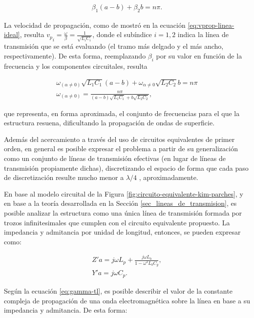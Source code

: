 \begin{align}
	\beta_1 (a-b) + \beta_2 b = n\pi .
\end{align}

La velocidad de propagación, como de mostró en la ecuación \ref{eq:vprop-linea-ideal}, resulta ${v_p}_i = \frac{\omega}{\beta} = \frac{1}{\sqrt{L_i C_i}}$, donde el subíndice $i=1,2$ indica la línea de transmisión que se está evaluando (el tramo más delgado y el más ancho, respectivamente). De esta forma, reemplazando $\beta_i$ por su valor en función de la frecuencia y los componentes circuitales, resulta

\begin{align}
	\omega_{(\alpha\neq 0)} \sqrt{L_1 C_1} (a-b) + \omega_{\alpha\neq 0} \sqrt{L_2 C_2} b = n\pi \\
	\omega_{(\alpha\neq 0)} = \frac{n\pi}{(a-b) \sqrt{L_1 C_1} + b \sqrt{L_2 C_2}},
\end{align}

que representa, en forma aproximada, el conjunto de frecuencias para el que la estructura resuena, dificultando la propagación de ondas de superficie.


Además del acercamiento a través del uso de circuitos equivalentes de primer orden, en general es posible expresar el problema a partir de su generalización como un conjunto de líneas de transmisión efectivas (en lugar de líneas de transmisión propiamente dichas), discretizando el espacio de forma que cada paso de discretización resulte mucho menor a $\lambda/4$ \cite{Caloz:ElectromagneticMetamaterials}, aproximadamente.

En base al modelo circuital de la Figura \ref{fig:circuito-equivalente-kim-parches}, y en base a la teoría desarrollada en la Sección \ref{sec_lineas_de_transmision}, es posible analizar la estructura como una única línea de transmisión formada por trozos infinitesimales que cumplen con el circuito equivalente propuesto. La impedancia y admitancia por unidad de longitud, entonces, se pueden expresar como:

\begin{align}
	Z' a = j\omega L_p + \frac{j\omega L_b}{1-\omega^2 L_b C_g}, \\
	Y' a = j\omega C_p.
\end{align}

Según la ecuación \ref{eq:gamma-tl}, es posible describir el valor de la constante compleja de propagación de una onda electromagnética sobre la línea en base a su impedancia y admitancia. De esta forma:

